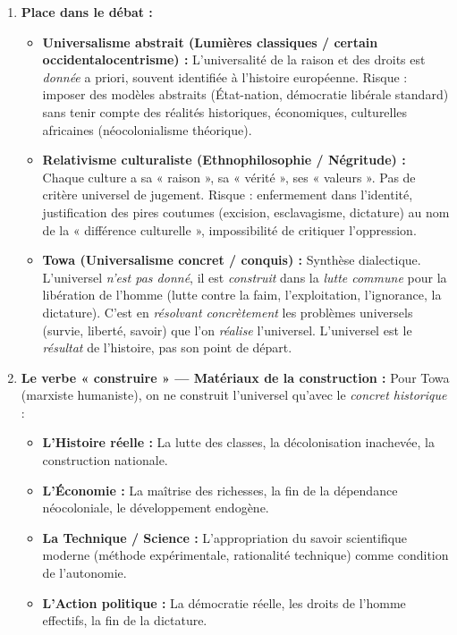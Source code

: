 \documentclass[11pt]{article}
\begin{document}
\begin{corrige}
\begin{enumerate}
\item \textbf{Place dans le débat :}
\begin{itemize}
\item \textbf{Universalisme abstrait (Lumières classiques / certain occidentalocentrisme) :} L'universalité de la raison et des droits est \emph{donnée} a priori, souvent identifiée à l'histoire européenne. Risque : imposer des modèles abstraits (État-nation, démocratie libérale standard) sans tenir compte des réalités historiques, économiques, culturelles africaines (néocolonialisme théorique).
\item \textbf{Relativisme culturaliste (Ethnophilosophie / Négritude) :} Chaque culture a sa « raison », sa « vérité », ses « valeurs ». Pas de critère universel de jugement. Risque : enfermement dans l'identité, justification des pires coutumes (excision, esclavagisme, dictature) au nom de la « différence culturelle », impossibilité de critiquer l'oppression.
\item \textbf{Towa (Universalisme concret / conquis) :} Synthèse dialectique. L'universel \emph{n'est pas donné}, il est \emph{construit} dans la \emph{lutte commune} pour la libération de l'homme (lutte contre la faim, l'exploitation, l'ignorance, la dictature). C'est en \emph{résolvant concrètement} les problèmes universels (survie, liberté, savoir) que l'on \emph{réalise} l'universel. L'universel est le \emph{résultat} de l'histoire, pas son point de départ.
\end{itemize}
\item \textbf{Le verbe « construire » — Matériaux de la construction :} Pour Towa (marxiste humaniste), on ne construit l'universel qu'avec le \emph{concret historique} :
\begin{itemize}
\item \textbf{L'Histoire réelle :} La lutte des classes, la décolonisation inachevée, la construction nationale.
\item \textbf{L'Économie :} La maîtrise des richesses, la fin de la dépendance néocoloniale, le développement endogène.
\item \textbf{La Technique / Science :} L'appropriation du savoir scientifique moderne (méthode expérimentale, rationalité technique) comme condition de l'autonomie.
\item \textbf{L'Action politique :} La démocratie réelle, les droits de l'homme effectifs, la fin de la dictature.

\end{itemize}
\end{enumerate}
\end{corrige}
\end{document}
